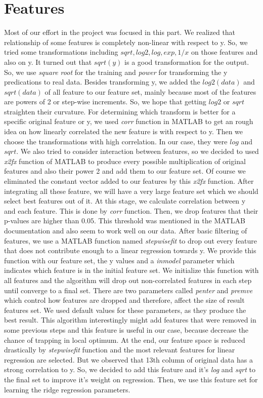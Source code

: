 \documentclass[a4paper, 11pt]{article}
\begin{document}
\section{Features}
Most of our effort in the project was focused in this part. We realized that relationship of some features is completely non-linear with respect to y. So, we tried some transformations including $sqrt, log2, log, exp, 1/x$ on those features and also on y. It turned out that \textit{$sqrt(y)$} is a good transformation for the output. So, we use \textit{square root} for the training and \textit{power} for transforming the y predications to real data. Besides transforming y, we added the $log2(data)$ and $sqrt(data)$ of all feature to our feature set, mainly because most of the features are powers of 2 or step-wise increments. So, we hope that getting $log2$ or $sqrt$ straighten their curvature. For determining which transform is better for a specific original feature or y, we used \textit{corr} function in MATLAB to get an rough idea on how linearly correlated the new feature is with respect to y. Then we choose the transformations with high correlation. In our case, they were $log$ and $sqrt$.  We also tried to  consider interaction between features, so we decided to used \textit{x2fx} function of MATLAB to produce every possible multiplication of original features and also their power 2 and add them to our feature set. Of course we eliminated the constant vector added to our features by this \textit{x2fx} function. After integrating all these feature, we will have a very large feature set which we should select best features out of it. At this stage, we calculate correlation between y and each feature. This is done by \textit{corr} function. Then, we drop features that their p-values are higher than $0.05$. This threshold was mentioned in the MATLAB documentation and also seem to work well on our data. After basic filtering of features, we use a MATLAB function named \textit{stepwisefit} to drop out every feature that does not contribute enough to a linear regression towards y. We provide this function with our feature set, the y values and a \textit{inmodel} parameter which indicates which feature is in the initial feature set. We initialize this function with all features and the algorithm will drop out non-correlated features in each step until converge to a final set. There are two parameters called \textit{penter} and \textit{premve} which control how features are dropped and therefore, affect the size of result features set. We used default values for these parameters, as they produce the best result. This algorithm interestingly might add features that were removed in some previous steps and this feature is useful in our case, because decrease the chance of trapping in local optimum. At the end, our feature space is reduced drastically by \textit{stepwisefit} function and the most relevant features for linear regression are selected. But we observed that 13th column of original data has a strong correlation to y. So, we decided to add this feature and it's \textit{log} and \textit{sqrt} to the final set to improve it's weight on regression. Then, we use this feature set for learning the ridge regression parameters. 
\end{document}
